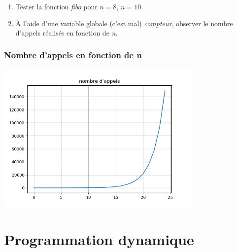\documentclass[svgnames,11pt]{beamer}
\begin{document}
\begin{frame}
    \frametitle{}

    \begin{activite}
        \begin{enumerate}
            \item Tester la fonction \emph{fibo} pour $n=8$, $n=10$.
            \item À l'aide d'une variable globale (c'est mal) \emph{compteur}, observer le nombre d'appels réalisés en fonction de \emph{n}.
        \end{enumerate}
    \end{activite}

\end{frame}

\begin{frame}
    \frametitle{}
    

\end{frame}
\begin{frame}
    \frametitle{Nombre d'appels en fonction de n}
    \begin{center}
        \centering
        \includegraphics[width=10cm]{ressources/nb-appels.png}
        \label{IMG}
    \end{center}
\end{frame}

\section{Programmation dynamique}
\end{document}
